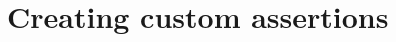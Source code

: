 \hypertarget{group___creating_new_assertions}{
\section{Creating custom assertions}
\label{group___creating_new_assertions}
}
